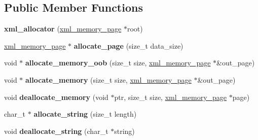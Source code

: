 \subsection*{Public Member Functions}
\begin{DoxyCompactItemize}
\item 
\hypertarget{structxml__allocator_ad41b1a18595953aa71a470b45921c0fd}{{\bfseries xml\-\_\-allocator} (\hyperlink{structxml__memory__page}{xml\-\_\-memory\-\_\-page} $\ast$root)}\label{structxml__allocator_ad41b1a18595953aa71a470b45921c0fd}

\item 
\hypertarget{structxml__allocator_a4b399b01e530220ec5849b912b84063b}{\hyperlink{structxml__memory__page}{xml\-\_\-memory\-\_\-page} $\ast$ {\bfseries allocate\-\_\-page} (size\-\_\-t data\-\_\-size)}\label{structxml__allocator_a4b399b01e530220ec5849b912b84063b}

\item 
\hypertarget{structxml__allocator_a30bb557bc040de54c041c6d3dca6772e}{void $\ast$ {\bfseries allocate\-\_\-memory\-\_\-oob} (size\-\_\-t size, \hyperlink{structxml__memory__page}{xml\-\_\-memory\-\_\-page} $\ast$\&out\-\_\-page)}\label{structxml__allocator_a30bb557bc040de54c041c6d3dca6772e}

\item 
\hypertarget{structxml__allocator_afac0b9fac2c2962972f60d0346eb4f39}{void $\ast$ {\bfseries allocate\-\_\-memory} (size\-\_\-t size, \hyperlink{structxml__memory__page}{xml\-\_\-memory\-\_\-page} $\ast$\&out\-\_\-page)}\label{structxml__allocator_afac0b9fac2c2962972f60d0346eb4f39}

\item 
\hypertarget{structxml__allocator_a5df417155487cce4e0460b123ac33dc6}{void {\bfseries deallocate\-\_\-memory} (void $\ast$ptr, size\-\_\-t size, \hyperlink{structxml__memory__page}{xml\-\_\-memory\-\_\-page} $\ast$page)}\label{structxml__allocator_a5df417155487cce4e0460b123ac33dc6}

\item 
\hypertarget{structxml__allocator_ac5ec2b5d41672d6494a2742e95e525b3}{char\-\_\-t $\ast$ {\bfseries allocate\-\_\-string} (size\-\_\-t length)}\label{structxml__allocator_ac5ec2b5d41672d6494a2742e95e525b3}

\item 
\hypertarget{structxml__allocator_af32c538db4d562c2d0bfe15f7c0aa879}{void {\bfseries deallocate\-\_\-string} (char\-\_\-t $\ast$string)}\label{structxml__allocator_af32c538db4d562c2d0bfe15f7c0aa879}

\end{DoxyCompactItemize}
